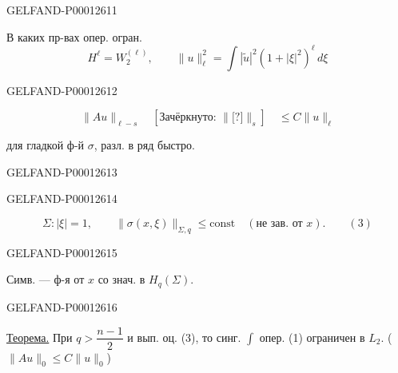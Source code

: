 \begin{GelfandAdjacentEvidence}{GELFAND-P000126}{11}

В каких пр-вах опер. огран.
\begin{equation*}H^\ell=W_2^{(\ell)},\qquad\|u\|_\ell^2=\int|\widetilde u|^2(1+|\xi|^2)^\ell\,d\xi\end{equation*}
\end{GelfandAdjacentEvidence}
\begin{GelfandAdjacentEvidence}{GELFAND-P000126}{12}

\begin{equation*}\|Au\|_{\ell-s}\quad[\text{Зачёркнуто: }\|\text{[?]}\|_s]\quad\le C\|u\|_\ell\end{equation*}

для гладкой ф-й $\sigma$, разл. в ряд быстро.
\end{GelfandAdjacentEvidence}
\begin{GelfandAdjacentEvidence}{GELFAND-P000126}{13}


\end{GelfandAdjacentEvidence}
\begin{GelfandAdjacentEvidence}{GELFAND-P000126}{14}

\begin{equation*}\Sigma:|\xi|=1,\qquad\|\sigma(x,\xi)\|_{\Sigma,q}\le\mathrm{const}\quad(\text{не зав. от }x).\qquad(3)\end{equation*}
\end{GelfandAdjacentEvidence}
\begin{GelfandAdjacentEvidence}{GELFAND-P000126}{15}

Симв. — ф-я от $x$ со знач. в $H_q(\Sigma)$.
\end{GelfandAdjacentEvidence}
\begin{GelfandAdjacentEvidence}{GELFAND-P000126}{16}

\underline{Теорема.}
При $q>\dfrac{n-1}{2}$ и вып. оц. (3), то синг. $\int$ опер. (1)
ограничен в $L_2$. ($\|Au\|_0\le C\|u\|_0$)
\end{GelfandAdjacentEvidence}
